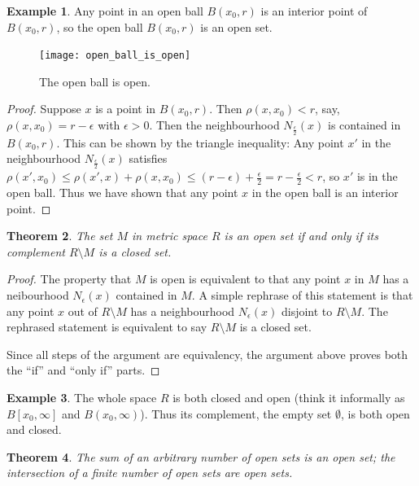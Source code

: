 \documentclass[a4paper,12pt]{article}
\newtheorem{thm}{Theorem}[section]
\theoremstyle{definition}
\newtheorem{expl}[thm]{Example}
\theoremstyle{remark}
\begin{document}
\begin{expl}
  Any point in an open ball $B(x_0, r)$ is an interior point of $B(x_0, r)$, so the open ball $B(x_0, r)$ is an open set.
\end{expl}
\begin{figure}[h]
  \centering
  \texttt{[image: open\_ball\_is\_open]}
  \caption{The open ball is open.}
\end{figure}
\begin{proof}
  Suppose $x$ is a point in $B(x_0, r)$. Then $\rho(x, x_0) < r$, say, $\rho(x, x_0) = r - \epsilon$ with $\epsilon > 0$. Then the neighbourhood $N_{\frac{\epsilon}{2}}(x)$ is contained in $B(x_0, r)$. This can be shown by the triangle inequality: Any point $x'$ in the neighbourhood $N_{\frac{\epsilon}{2}}(x)$ satisfies $\rho(x', x_0) \leq \rho(x', x) + \rho(x, x_0) \leq (r - \epsilon) + \frac{\epsilon}{2} = r - \frac{\epsilon}{2} < r$, so $x'$ is in the open ball. Thus we have shown that any point $x$ in the open ball is an interior point.
\end{proof}

\begin{thm}
  The set $M$ in metric space $R$ is an open set if and only if its complement $R \setminus M$ is a closed set.
\end{thm}

\begin{proof}
  The property that $M$ is open is equivalent to that any point $x$ in $M$ has a neibourhood $N_{\epsilon}(x)$ contained in $M$. A simple rephrase of this statement is that any point $x$ out of $R \setminus M$ has a neighbourhood $N_{\epsilon}(x)$ disjoint to $R \setminus M$. The rephrased statement is equivalent to say $R \setminus M$ is a closed set.

  Since all steps of the argument are equivalency, the argument above proves both the ``if'' and ``only if'' parts.
\end{proof}

\begin{expl}
  The whole space $R$ is both closed and open (think it informally as $B[x_0, \infty]$ and $B(x_0, \infty)$). Thus its complement, the empty set $\emptyset$, is both open and closed.
\end{expl}

\begin{thm} \label{thm:open_closed_relation}
  The sum of an arbitrary number of open sets is an open set; the intersection of a finite number of open sets are open sets.
\end{thm}
\end{document}

